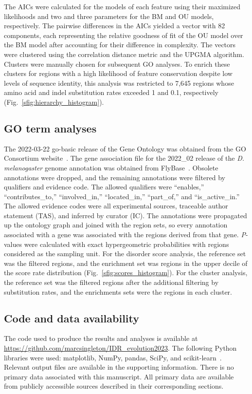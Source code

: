 The AICs were calculated for the models of each feature using their maximized likelihoods and two and three parameters for the BM and OU models, respectively. The pairwise differences in the AICs yielded a vector with 82 components, each representing the relative goodness of fit of the OU model over the BM model after accounting for their difference in complexity. The vectors were clustered using the correlation distance metric and the UPGMA algorithm. Clusters were manually chosen for subsequent GO analyses. To enrich these clusters for regions with a high likelihood of feature conservation despite low levels of sequence identity, this analysis was restricted to 7,645 regions whose amino acid and indel substitution rates exceeded 1 and 0.1, respectively (Fig.~\ref{sfig:hierarchy_histogram}).

\subsection{GO term analyses}
The 2022-03-22 go-basic release of the Gene Ontology was obtained from the GO Consortium website~\cite{Ashburner2000, 2020GOConsortium}. The gene association file for the 2022\_02 release of the \textit{D. melanogaster} genome annotation was obtained from FlyBase~\cite{Gramates2022}. Obsolete annotations were dropped, and the remaining annotations were filtered by qualifiers and evidence code. The allowed qualifiers were ``enables,'' ``contributes\_to,'' ``involved\_in,'' ``located\_in,'' ``part\_of,'' and ``is\_active\_in.'' The allowed evidence codes were all experimental sources, traceable author statement (TAS), and inferred by curator (IC). The annotations were propagated up the ontology graph and joined with the region sets, so every annotation associated with a gene was associated with the regions derived from that gene. \textit{P}-values were calculated with exact hypergeometric probabilities with regions considered as the sampling unit. For the disorder score analysis, the reference set was the filtered regions, and the enrichment set was regions in the upper decile of the score rate distribution (Fig.~\ref{sfig:scores_histogram}). For the cluster analysis, the reference set was the filtered regions after the additional filtering by substitution rates, and the enrichments sets were the regions in each cluster.

\subsection{Code and data availability}
\begin{sloppypar}
The code used to produce the results and analyses is available at \url{https://github.com/marcsingleton/IDR_evolution2023}. The following Python libraries were used: matplotlib, NumPy, pandas, SciPy, and scikit-learn~\cite{Hunter2007, Harris2020, McKinney2010, Virtanen2020, Pedregosa2011}. Relevant output files are available in the supporting information. There is no primary data associated with this manuscript. All primary data are available from publicly accessible sources described in their corresponding sections.
\end{sloppypar}